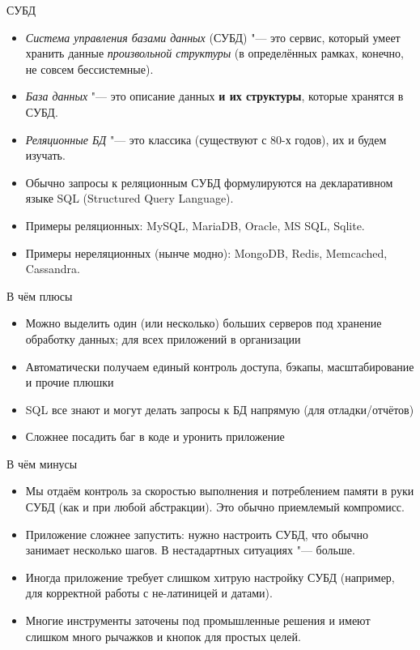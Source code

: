 \begin{frame}[t]{СУБД}
	\begin{itemize}
		\item \textit{Система управления базами данных} (СУБД) "--- это сервис, который умеет хранить данные \textit{произвольной структуры}
			(в определённых рамках, конечно, не совсем бессистемные).
		\item \textit{База данных} "--- это описание данных \textbf{и их структуры}, которые хранятся в СУБД.
		\item \textit{Реляционные БД} "--- это классика (существуют с 80-х годов), их и будем изучать.
		\item Обычно запросы к реляционным СУБД формулируются на декларативном языке SQL
			(Structured Query Language).
		\item Примеры реляционных: MySQL, MariaDB, Oracle, MS SQL, Sqlite.
		\item Примеры нереляционных (нынче модно): MongoDB, Redis, Memcached, Cassandra.
	\end{itemize}
\end{frame}

\begin{frame}[t]{В чём плюсы}
	\begin{itemize}
		\item Можно выделить один (или несколько) больших серверов под хранение обработку данных; для всех приложений в организации
		\item Автоматически получаем единый контроль доступа, бэкапы, масштабирование и прочие плюшки
		\item SQL все знают и могут делать запросы к БД напрямую (для отладки/отчётов)
		\item Сложнее посадить баг в коде и уронить приложение
	\end{itemize}
\end{frame}

\begin{frame}{В чём минусы}
	\begin{itemize}
		\item
			Мы отдаём контроль за скоростью выполнения и потреблением памяти в руки СУБД
			(как и при любой абстракции).
			Это обычно приемлемый компромисс.
		\item
			Приложение сложнее запустить: нужно настроить СУБД, что обычно занимает несколько шагов.
			В нестадартных ситуациях "--- больше.
		\item
			Иногда приложение требует слишком хитрую настройку СУБД (например, для корректной работы
			с не-латиницей и датами).
		\item
			Многие инструменты заточены под промышленные решения и имеют слишком много рычажков и кнопок
			для простых целей.
	\end{itemize}
\end{frame}

